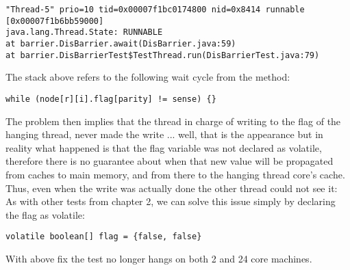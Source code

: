 \begin{verbatim}
"Thread-5" prio=10 tid=0x00007f1bc0174800 nid=0x8414 runnable [0x00007f1b6bb59000]
java.lang.Thread.State: RUNNABLE
at barrier.DisBarrier.await(DisBarrier.java:59)
at barrier.DisBarrierTest$TestThread.run(DisBarrierTest.java:79)
\end{verbatim}
\hfill

The stack above refers to the following wait cycle from the  method: \\

\begin{lstlisting}[style=nonumbers]
      while (node[r][i].flag[parity] != sense) {}
\end{lstlisting}
\hfill

The problem then implies that the thread in charge of writing to the
flag of the hanging thread, never made the write ... well, that is the
appearance but in reality what happened is that the flag variable was
not declared as volatile, therefore there is no guarantee about when
that new value will be propagated from caches to main memory, and from
there to the hanging thread core's cache. Thus, even when the write
was actually done the other thread could not see it: \\ 

As with other tests from chapter 2, we can solve this issue simply by
declaring the flag as volatile: \\

\begin{lstlisting}[style=nonumbers]
volatile boolean[] flag = {false, false}
\end{lstlisting}
\hfill

With above fix the test no longer hangs on both 2 and 24 core machines. 

